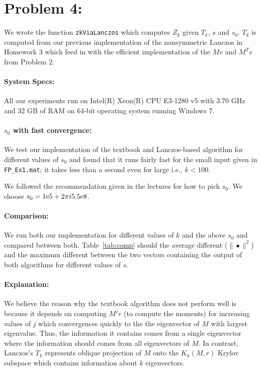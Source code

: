 \section*{Problem 4:}
We wrote the function \texttt{zkViaLanczos} which computes $Z_k$	given $T_{k}$, $s$ and $s_{0}$. $T_{k}$ is computed from our previous implementation of the nonsymmetric Lanczos in Homework 3 which feed in with the efficient implementation of the $Mv$ and $M^{T}v$ from Problem 2. 

\paragraph{System Specs:} All our experiments run on Intel(R) Xeon(R) CPU E3-1280 v5 with 3.70 GHz and 32 GB of RAM on 64-bit operating system running Windows 7. 

\paragraph{$s_0$ with fast convergence:} We test our implementation of the textbook and Lanczos-based algorithm for different values of $s_{0}$ and found that it runs fairly fast for the small input given in \texttt{FP\_Ex1.mat}; it takes less than a second even for large i.e., $k < 100$. 

We followed the recommendation given in the lectures for how to pick $s_{0}$. We choose $s_{0} = {1}\mathrm{e}{5} + 2\pi i {5.5}\mathrm{e}{8} $. 

\paragraph{Comparison:} We run both our implementation for different values of $k$ and the above $s_{0}$ and compared between both. Table~\ref{tab:comp} should the average different ($\parallel \dot{•} \parallel^{2}$) and the maximum different between the two vectors containing the output of both algorithms for different values of $s$. 

\paragraph{Explanation:} We believe the reason why the textbook algorithm does not perform well is because it depends on computing $M^{j}r$ (to compute the moments) for increasing values of $j$ which convergences quickly to the the eigenvector of $M$ with largest eigenvalue. Thus, the information it contains comes from a single eigenvector where the information should comes from all eigenvectors of $M$. In contrast, Lanczos's $T_{k}$ represents oblique projection of $M$ onto the $K_{k}(M,r)$ Krylov subspace which contains information about $k$ eigenvectors. 




